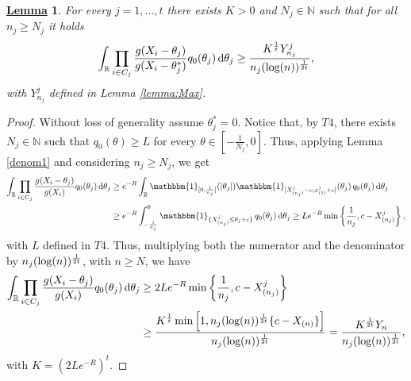 \documentclass[12pt]{article}
\newtheorem{Lem}{\underline{\bf Lemma}}
\def \R {\mathbb{R} }
\def\log{\hbox{log}}
\begin{document}
\begin{Lem}\label{denom}
For every $j = 1, \dots, t$ there exists $K>0$ and $N_j \in \mathbb{N}$ such that for all $n_j\geq N_j$  it holds
\[
\int_\R \prod_{i \in C_j}\frac{g(X_i - \theta_j)}{g(X_i-\theta_j^*)}q_0(\theta_j) \, \mathrm{d}\theta_j %
\geq %
\frac{K^{\frac{1}{t}} Y^j_{n_j} }{n_j(\log(n))^{\frac{1}{2t}}},
\]
with $Y^j_{n_j}$ defined in Lemma \ref{lemma:Max}.
\end{Lem}
\begin{proof}
Without loss of generality assume $\theta_j^* = 0$. Notice that, by $T4$, there exists $N_j \in \mathbb{N}$ such that $q_0(\theta) \geq L$ for every $\theta \in \left[-\frac{1}{N_j},0\right]$. Thus, applying Lemma \ref{denom1} and considering $n_j \geq N_j$, we get
\[
\begin{aligned}
\int_\R \prod_{i \in C_j}\frac{g(X_i - \theta_j)}{g(X_i)}q_0(\theta_j) \, \mathrm{d}\theta_j&\geq e^{-R}\int_\R \mathbbm{1}_{[0,\frac{1}{n_j}]} (|\theta_j|) \mathbbm{1}_{[X^j_{(n_j)}-c,x^j_{(1)}+c]}(\theta_j) \, q_0(\theta_j)\, \mathrm{d}\theta_j\\
& \geq e^{-R}\int_{-\frac{1}{n_j}}^0\mathbbm{1}_{\{X^j_{(n_j)} \leq \theta_j+c\}} \, q_0(\theta_j) \, \mathrm{d}\theta_j \geq Le^{-R}\min \left\{\frac{1}{n_j}, c-X^j_{(n_j)} \right\},
\end{aligned}
\]
with $L$ defined in $T4$. Thus, multiplying both the numerator and the denominator by $n_j(\log(n))^{\frac{1}{2t}}$, with $n \geq N$, we have
\[
\begin{aligned}
\int_\R \prod_{i \in C_j}\frac{g(X_i - \theta_j)}{g(X_i)}q_0(\theta_j) \, \mathrm{d}\theta_j &\geq 2 Le^{-R}\min \left\{\frac{1}{n_j}, c-X^j_{(n_j)} \right\} \\%
& \geq \frac{K^{\frac{1}{t}} \min \left[1, n_j(\log(n))^{\frac{1}{2t}}\{c-X_{(n)}\} \right]}{n_j(\log(n))^{\frac{1}{2t}}} =  \frac{K^{\frac{1}{2t}} Y_n }{n_j(\log(n))^{\frac{1}{2t}}},
\end{aligned}
\]
with $K = (2Le^{-R})^t$.
\end{proof}
\end{document}
